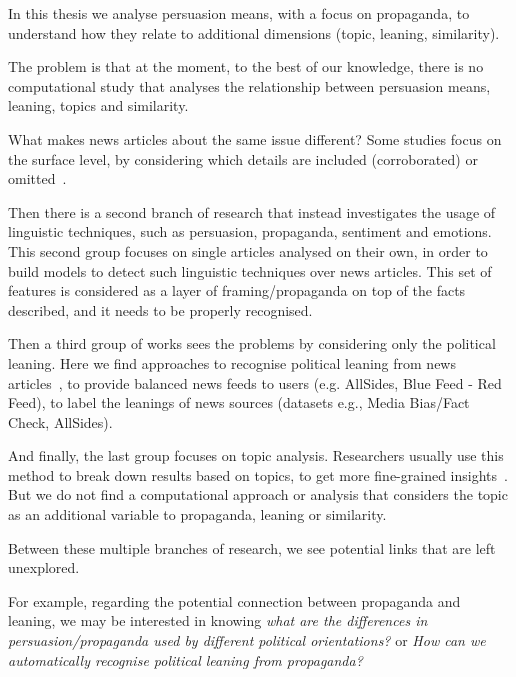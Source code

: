 
In this thesis we analyse persuasion means, with a focus on propaganda, to understand how they relate to additional dimensions (topic, leaning, similarity).

The problem is that at the moment, to the best of our knowledge, there is no computational study that analyses the relationship between persuasion means, leaning, topics and similarity.

What makes news articles about the same issue different? 
Some studies focus on the surface level, by considering which details are included (corroborated) or omitted~\citep{bountouridis2018explaining}.

Then there is a second branch of research that instead investigates the usage of linguistic techniques, such as persuasion, propaganda, sentiment and emotions. This second group focuses on single articles analysed on their own, in order to build models to detect such linguistic techniques over news articles. This set of features is considered as a layer of framing/propaganda on top of the facts described, and it needs to be properly recognised.

Then a third group of works sees the problems by considering only the political leaning. Here we find approaches to recognise political leaning from news articles~\citep{baly2020we}, to provide balanced news feeds to users (e.g. AllSides, Blue Feed - Red Feed), to label the leanings of news sources (datasets e.g., Media Bias/Fact Check, AllSides).

And finally, the last group focuses on topic analysis. Researchers usually use this method to break down results based on topics, to get more fine-grained insights~\citep{zhang2023strategic}.
But we do not find a computational approach or analysis that considers the topic as an additional variable to propaganda, leaning or similarity.


Between these multiple branches of research, we see potential links that are left unexplored.

For example, regarding the potential connection between propaganda and leaning, we may be interested in knowing \emph{what are the differences in persuasion/propaganda used by different political orientations?} or \emph{How can we automatically recognise political leaning from propaganda?}

